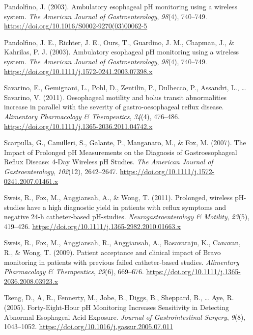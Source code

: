 \documentclass[english,man,floatsintext]{apa6}
\begin{document}
\leavevmode\hypertarget{ref-Pandolfino2003a}{}%
Pandolfino, J. (2003). Ambulatory esophageal pH monitoring using a wireless system. \emph{The American Journal of Gastroenterology}, \emph{98}(4), 740--749. \url{https://doi.org/10.1016/S0002-9270(03)00062-5}

\leavevmode\hypertarget{ref-Pandolfino2003}{}%
Pandolfino, J. E., Richter, J. E., Ours, T., Guardino, J. M., Chapman, J., \& Kahrilas, P. J. (2003). Ambulatory esophageal pH monitoring using a wireless system. \emph{The American Journal of Gastroenterology}, \emph{98}(4), 740--749. \url{https://doi.org/10.1111/j.1572-0241.2003.07398.x}

\leavevmode\hypertarget{ref-Savarino2011}{}%
Savarino, E., Gemignani, L., Pohl, D., Zentilin, P., Dulbecco, P., Assandri, L., \ldots{} Savarino, V. (2011). Oesophageal motility and bolus transit abnormalities increase in parallel with the severity of gastro-oesophageal reflux disease. \emph{Alimentary Pharmacology \& Therapeutics}, \emph{34}(4), 476--486. \url{https://doi.org/10.1111/j.1365-2036.2011.04742.x}

\leavevmode\hypertarget{ref-Scarpulla2007a}{}%
Scarpulla, G., Camilleri, S., Galante, P., Manganaro, M., \& Fox, M. (2007). The Impact of Prolonged pH Measurements on the Diagnosis of Gastroesophageal Reflux Disease: 4-Day Wireless pH Studies. \emph{The American Journal of Gastroenterology}, \emph{102}(12), 2642--2647. \url{https://doi.org/10.1111/j.1572-0241.2007.01461.x}

\leavevmode\hypertarget{ref-Sweis2011}{}%
Sweis, R., Fox, M., Anggiansah, A., \& Wong, T. (2011). Prolonged, wireless pH-studies have a high diagnostic yield in patients with reflux symptoms and negative 24-h catheter-based pH-studies. \emph{Neurogastroenterology \& Motility}, \emph{23}(5), 419--426. \url{https://doi.org/10.1111/j.1365-2982.2010.01663.x}

\leavevmode\hypertarget{ref-Sweis2009}{}%
Sweis, R., Fox, M., Anggiansah, R., Anggiansah, A., Basavaraju, K., Canavan, R., \& Wong, T. (2009). Patient acceptance and clinical impact of Bravo monitoring in patients with previous failed catheter-based studies. \emph{Alimentary Pharmacology \& Therapeutics}, \emph{29}(6), 669--676. \url{https://doi.org/10.1111/j.1365-2036.2008.03923.x}

\leavevmode\hypertarget{ref-TSENG2005a}{}%
Tseng, D., A, R., Fennerty, M., Jobe, B., Diggs, B., Sheppard, B., \ldots{} Aye, R. (2005). Forty-Eight-Hour pH Monitoring Increases Sensitivity in Detecting Abnormal Esophageal Acid Exposure. \emph{Journal of Gastrointestinal Surgery}, \emph{9}(8), 1043--1052. \url{https://doi.org/10.1016/j.gassur.2005.07.011}
\end{document}
